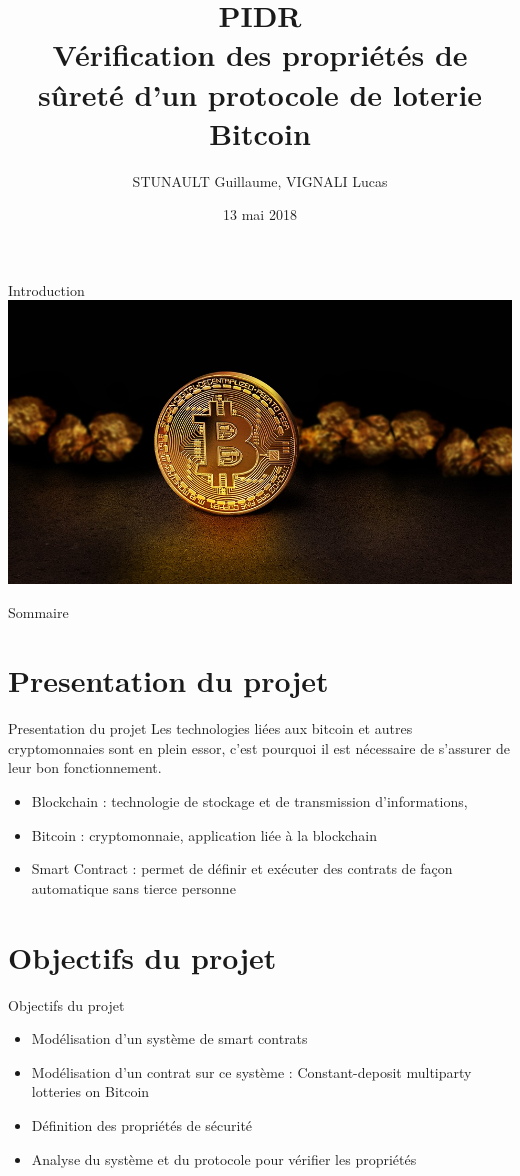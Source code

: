 \documentclass[french]{beamer}
\title[Présentation PIDR]{PIDR\\Vérification des propriétés de sûreté d'un protocole de loterie Bitcoin}
\author{STUNAULT Guillaume, VIGNALI Lucas}
\date{13 mai 2018}
\institute{TELECOM Nancy}
\begin{document}
\begin{frame}
	\titlepage
\end{frame}


\begin{frame}{Introduction}
\centering
\includegraphics[scale=1]{bitcoin.jpg}\\
\end{frame}

\begin{frame}{Sommaire}
	\tableofcontents
\end{frame}


\section{Presentation du projet}
\begin{frame}{Presentation du projet}
Les technologies liées aux bitcoin et autres cryptomonnaies sont en plein essor, c'est pourquoi il est nécessaire de s'assurer de leur bon fonctionnement. 
\begin{itemize}
    \item Blockchain : technologie de stockage et de transmission d’informations,
    \item Bitcoin : cryptomonnaie, application liée à la blockchain 
    \item Smart Contract : permet de définir et exécuter des contrats de façon automatique sans tierce personne
\end{itemize}
\end{frame}


\section{Objectifs du projet}
\begin{frame}{Objectifs du projet}
\begin{itemize}
    \item Modélisation d'un système de smart contrats
    \item Modélisation d'un contrat sur ce système : Constant-deposit multiparty lotteries on Bitcoin
    \item Définition des propriétés de sécurité
    \item Analyse du système et du protocole pour vérifier les propriétés
\end{itemize}
\end{frame}
\end{document}
